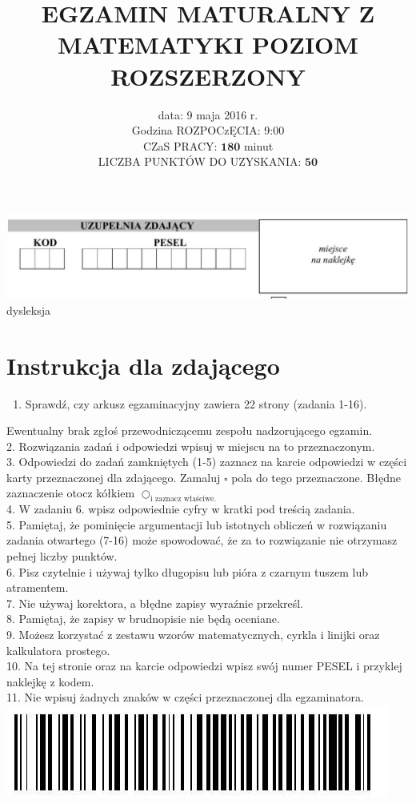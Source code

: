\documentclass[10pt]{article}
\title{EGZAMIN MATURALNY Z MATEMATYKI POZIOM ROZSZERZONY }
\author{data: 9 maja 2016 r.\\
Godzina ROZPOCzĘCIA: 9:00\\
CZaS PRACY: \(\mathbf{1 8 0}\) minut\\
LICZBA PUNKTÓW DO UZYSKANIA: \(\mathbf{5 0}\)}
\date{}
\begin{document}
\maketitle
\includegraphics[max width=\textwidth, center]{2024_11_21_054c332d5c02f869c372g-01(1)}\\
dysleksja



\section*{Instrukcja dla zdającego}
\begin{enumerate}
  \item Sprawdź, czy arkusz egzaminacyjny zawiera 22 strony (zadania 1-16).
\end{enumerate}

Ewentualny brak zgłoś przewodniczącemu zespołu nadzorującego egzamin.\\
2. Rozwiązania zadań i odpowiedzi wpisuj w miejscu na to przeznaczonym.\\
3. Odpowiedzi do zadań zamkniętych (1-5) zaznacz na karcie odpowiedzi w części karty przeznaczonej dla zdającego. Zamaluj \(\square\) pola do tego przeznaczone. Błędne zaznaczenie otocz kółkiem \(\bigcirc_{\text {i zaznacz właściwe. }}\)\\
4. W zadaniu 6. wpisz odpowiednie cyfry w kratki pod treścią zadania.\\
5. Pamiętaj, że pominięcie argumentacji lub istotnych obliczeń w rozwiązaniu zadania otwartego (7-16) może spowodować, że za to rozwiązanie nie otrzymasz pełnej liczby punktów.\\
6. Pisz czytelnie i używaj tylko długopisu lub pióra z czarnym tuszem lub atramentem.\\
7. Nie używaj korektora, a błędne zapisy wyraźnie przekreśl.\\
8. Pamiętaj, że zapisy w brudnopisie nie będą oceniane.\\
9. Możesz korzystać z zestawu wzorów matematycznych, cyrkla i linijki oraz kalkulatora prostego.\\
10. Na tej stronie oraz na karcie odpowiedzi wpisz swój numer PESEL i przyklej naklejkę z kodem.\\
11. Nie wpisuj żadnych znaków w części przeznaczonej dla egzaminatora.\\
\includegraphics[max width=\textwidth, center]{2024_11_21_054c332d5c02f869c372g-01}
\end{document}

